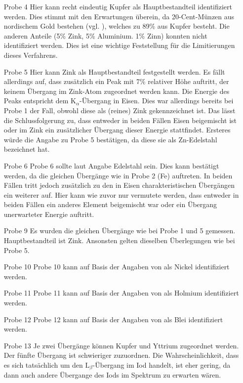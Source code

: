 \documentclass[
	a4paper,
	12pt,
	pagesize,
	ngerman
]{scrartcl}
\begin{document}
	\begin{enumerate} %
		\item[Probe 4] Hier kann recht eindeutig Kupfer als Hauptbestandteil identifiziert werden. Dies stimmt mit den Erwartungen überein, da 20-Cent-Münzen aus nordischem Gold bestehen (vgl. \cite{muenzen}), welches zu 89\% aus Kupfer besteht. Die anderen Anteile (5\% Zink, 5\% Aluminium. 1\% Zinn) konnten nicht identifiziert werden. Dies ist eine wichtige Feststellung für die Limitierungen dieses Verfahrens. %
		\item[Probe 5] Hier kann Zink als Hauptbestandteil festgestellt werden. Es fällt allerdings auf, dass zusätzlich ein Peak mit 7\% relativer Höhe auftritt, der keinem Übergang im Zink-Atom zugeordnet werden kann. Die Energie des Peaks entspricht dem $\text{K}_\alpha$-Übergang in Eisen. Dies war allerdings bereits bei Probe 1 der Fall, obwohl diese als (reines) Zink gekennzeichnet ist. Das lässt die Schlussfolgerung zu, dass entweder in beiden Fällen Eisen beigemischt ist oder im Zink ein zusätzlicher Übergang dieser Energie stattfindet. Ersteres würde die Angabe zu Probe 5 bestätigen, da diese sie als Zn-Edelstahl bezeichnet hat. %
		\item[Probe 6] Probe 6 sollte laut Angabe Edelstahl sein. Dies kann bestätigt werden, da die gleichen Übergänge wie in Probe 2 (Fe) auftreten. In beiden Fällen tritt jedoch zusätzlich zu den in Eisen charakteristischen Übergängen ein weiterer auf. Hier kann wie zuvor nur vermutete werden, dass entweder in beiden Fällen ein anderes Element beigemischt war oder ein Übergang unerwarteter Energie auftritt.
		\item[Probe 9] Es wurden die gleichen Übergänge wie bei Probe 1 und 5 gemessen. Hauptbestandteil ist Zink. Ansonsten gelten dieselben Überlegungen wie bei Probe 5.
		\item[Probe 10] Probe 10 kann auf Basis der Angaben von \cite{XRAYDB} als Nickel identifiziert werden.
		\item[Probe 11] Probe 11 kann auf Basis der Angaben von \cite{XRAYDB} als Holmium identifiziert werden. %
		\item[Probe 12] Probe 12 kann auf Basis der Angaben von \cite{XRAYDB} als Blei identifiziert werden.
		\item[Probe 13] Je zwei Übergänge können Kupfer und Yttrium zugeordnet werden. Der fünfte Übergang ist schwieriger zuzuordnen. Die Wahrscheinlichkeit, dass es sich tatsächlich um den $\text{L}_\beta$-Übergang im Iod handelt, ist eher gering, da dann auch andere Übergange des Iods im Spektrum zu erwarten wären.

\end{enumerate}
\end{document}
